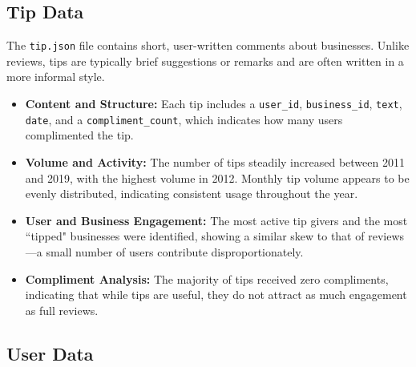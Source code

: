 \documentclass[conference]{IEEEtran}
\begin{document}
\subsection{Tip Data}

The \texttt{tip.json} file contains short, user-written comments about businesses.
Unlike reviews, tips are typically brief suggestions or remarks and are often
written in a more informal style.
\begin{itemize}
    \item \textbf{Content and Structure:} Each tip includes a \texttt{user\_id},
    \texttt{business\_id}, \texttt{text}, \texttt{date}, and a \texttt{compliment\_count},
    which indicates how many users complimented the tip.
    \item \textbf{Volume and Activity:} The number of tips steadily increased
    between 2011 and 2019, with the highest volume in 2012. Monthly tip volume
    appears to be evenly distributed, indicating consistent usage throughout the year.
    \item \textbf{User and Business Engagement:} The most active tip givers and
    the most ``tipped" businesses were identified, showing a similar skew to that
    of reviews---a small number of users contribute disproportionately.
    \item \textbf{Compliment Analysis:} The majority of tips received zero
    compliments, indicating that while tips are useful, they do not attract as
    much engagement as full reviews.
\end{itemize}

\subsection{User Data}
\end{document}
